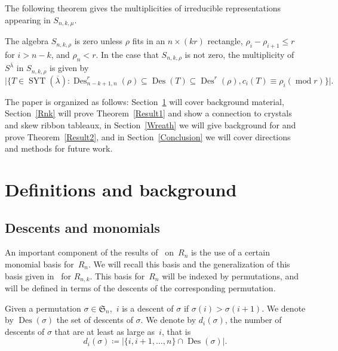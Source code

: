 \documentclass[ALCO,ThmDefs,Unicode,epreuves]{cedram}
\DeclareMathOperator{\modrm}{mod}
\DeclareMathOperator{\Des}{Des}
\DeclareMathOperator{\SYT}{SYT}
\begin{document}
The following theorem gives the multiplicities of irreducible representations appearing in $S_{n,k,\mu}$. 

\begin{thm}
\label{Result2}
	The algebra $S_{n,k,\rho}$ is zero unless $\rho$ fits in an $n\times (kr)$ rectangle, $\rho_i-\rho_{i+1}\leq r$ for 
$i>n-k$, and $\rho_n<r$.
	In the case that $S_{n,k,\rho}$ is not zero, the multiplicity of $S^{\overline{\lambda}}$ in $S_{n,k,\rho}$ is given by 
		\begin{equation}
\vert \{T\in \SYT (\overline{\lambda}):
\Des ^r_{n-k+1,n}(\rho)\subseteq \Des (T)\subseteq \Des ^r(\rho), c_i(T)\equiv \rho_i (\modrm r)\}\vert.
\end{equation}
\end{thm}


	The paper is organized as follows: Section~\ref{Def} will cover background material, Section~\ref{Rnk} will prove 
Theorem~\ref{Result1} and show a connection to crystals and skew ribbon tableaux, in Section~\ref{Wreath} we will give 
background for and prove Theorem~\ref{Result2}, and in Section~\ref{Conclusion} we will cover directions and methods 
for future work.

\section{Definitions and background}
\label{Def}

\subsection{Descents and monomials}


	An important component of the results of~\cite{ABR} on~$R_n$ is the use of a certain monomial basis for~$R_n$. We will 
recall this basis and the generalization of this basis given in~\cite{HRS} for $R_{n,k}$. This basis for~$R_n$ will be 
indexed by permutations, and will be defined in terms of the descents of the corresponding permutation.

	Given a permutation $\sigma\in \mathfrak{S}_n$,~$i$ is a descent of $\sigma$ if $\sigma(i)>\sigma(i+1)$. We denote by 
$\Des (\sigma)$ the set of descents of $\sigma$. We denote by $d_i(\sigma)$, the number of descents of $\sigma$ that are at 
least as large as~$i$, that is 
		\begin{equation}
d_i(\sigma)\coloneqq \vert \{i,i+1,\ldots, n\}\cap \Des (\sigma)\vert.
\end{equation}
\end{document}
